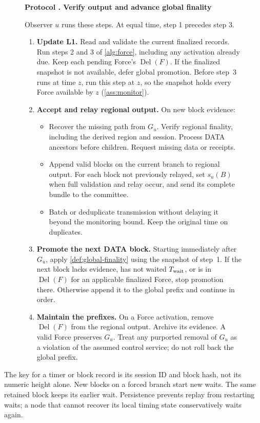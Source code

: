 \documentclass[11pt,a4paper]{article}
\newcommand{\Del}{\operatorname{Del}}
\newcommand{\Twait}{T_{\rm wait}}
\newcounter{protocol}
\newenvironment{protocol}[2]{\begin{figure}[htbp]\refstepcounter{protocol}\label{#1}
\begin{mdframed}[linewidth=.6pt,skipabove=0pt,skipbelow=0pt,
innertopmargin=7pt,innerbottommargin=7pt]\small
\textbf{Protocol \theprotocol. #2}\par\smallskip}{\end{mdframed}\end{figure}}
\begin{document}
\begin{protocol}{alg:external}{Verify output and advance global finality}
Observer $u$ runs these steps. At equal time, step 1 precedes step 3.
\begin{enumerate}[label=\textbf{\arabic*)},itemsep=3pt]
\item \textbf{Update L1.} Read and validate the current finalized
records. Run steps 2 and 3 of \cref{alg:force}, including any activation already due.
Keep each pending Force's $\Del(F)$. If the finalized
snapshot is not available, defer global promotion.
Before step~3 runs at time $z$, run this step at $z$, so the
snapshot holds every Force available by $z$ (\cref{ass:monitor}).

\item \textbf{Accept and relay regional output.} On new block evidence:
\begin{itemize}
\item Recover the missing path from $G_u$. Verify
regional finality, including the derived region and session.
Process DATA ancestors before children. Request missing data or receipts.
\item Append valid blocks on the current branch to regional output.
For each block not previously relayed, set $s_u(B)$ when full validation
and relay occur, and send its complete bundle to the committee.
\item Batch or deduplicate transmission without delaying it beyond
the monitoring bound. Keep the original time on duplicates.
\end{itemize}

\item \textbf{Promote the next DATA block.} Starting immediately after
$G_u$, apply \cref{def:global-finality} using the snapshot of step~1.
If the next block lacks evidence, has not waited $\Twait$, or is
in $\Del(F)$ for an applicable finalized Force, stop promotion there.
Otherwise append it to the global prefix and continue in order.

\item \textbf{Maintain the prefixes.} On a Force activation, remove
$\Del(F)$ from the regional output. Archive its evidence. A valid Force preserves $G_u$. Treat any
purported removal of $G_u$ as a violation of the assumed control
service; do not roll back the global prefix.
\end{enumerate}
\end{protocol}

The key for a timer or block record is its session ID and block
hash, not its numeric height alone. New blocks on a forced branch start
new waits. The same retained block keeps its earlier wait. Persistence
prevents replay from restarting waits; a node that cannot recover its
local timing state conservatively waits again.
\end{document}
